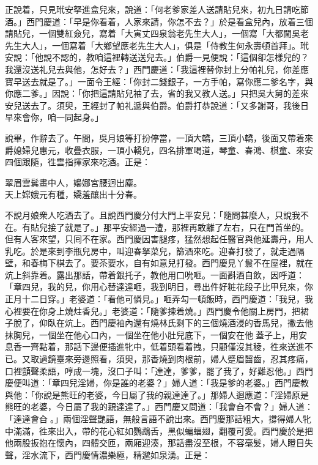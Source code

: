 正說着，只見玳安拏進盒兒來，說道：「何老爹家差人送請貼兒來，初九日請吃節酒。」西門慶道：「早是你看着，人家來請，你怎不去？」於是看盒兒內，放着三個請貼兒，一個雙紅僉兒，寫着「大寅丈四泉翁老先生大人」，一個寫「大都閫吳老先生大人」，一個寫着「大鄉望應老先生大人」，俱是「侍教生何永壽頓首拜」。玳安說：「他說不認的，教咱這裡轉送送兒去。」伯爵一見便說：「這個卻怎樣兒的？我還沒送礼兒去與他，怎好去？」西門慶道：「我這裡替你封上分帕礼兒，你差應寶早送去就是了。」一面令王經：「你封二錢銀子，一方手帕，寫你應二爹名字，與你應二爹。」因說：「你把這請貼兒袖了去，省的我又教人送。」只把吳大舅的差來安兒送去了。須臾，王經封了帕礼遞與伯爵。伯爵打恭說道：「又多謝哥，我後日早來會你，咱一同起身。」

說畢，作辭去了。午間，吳月娘等打扮停當，一頂大轎，三頂小轎，後面又帶着來爵媳婦兒惠元，收疊衣服，一頂小轎兒，四名排軍喝道，琴童、春鴻、棋童、來安四個跟隨，徃雲指揮家來吃酒。正是：

\begin{myquote}
翠眉雲鬂畫中人，嬝娜宮腰迥出塵。\\天上嫦娥元有種，嬌羞釀出十分春。
\end{myquote}

不說月娘衆人吃酒去了。且說西門慶分付大門上平安兒：「隨問甚麼人，只說我不在。有貼兒接了就是了。」那平安經過一遭，那裡再敢離了左右，只在門首坐的。但有人客來望，只囘不在家。西門慶因害腿疼，猛然想起任醫官與他延壽丹，用人乳吃。{}於是來到李瓶兒房中，叫迎春拏菜兒，篩酒來吃。迎春打發了，就走過隔壁，和春梅下棋去了。要茶要水，自有如意兒打發。西門慶見丫鬟不在屋裡，就在炕上斜靠着。露出那話，帶着銀托子，教他用口吮咂。一面斟酒自飲，因呼道：「章四兒，我的兒，你用心替達達咂，我到明日，尋出件好粧花段子比甲兒來，你正月十二日穿。」老婆道：「看他可憐見。」咂弄勾一頓飯時，西門慶道：「我兒，我心裡要在你身上燒炷香兒。」老婆道：「隨爹揀着燒。」西門慶令他關上房門，把裙子脫了，仰臥在炕上。西門慶袖內還有燒林氏剩下的三個燒酒浸的香馬兒，撇去他抹胸兒，一個坐在他心口內，一個坐在他小肚兒底下，一個安在他𣭈蓋子上，用安息香一齊點着，那話下邊便插進牝中，低着頭看着拽，只顧僅沒其稜，徃來送進不已。又取過鏡臺來旁邊照看，{}須臾，那香燒到肉根前，婦人蹙眉齧齒，忍其疼痛，口裡顫聲柔語，哼成一塊，沒口子叫：「達達，爹爹，罷了我了，好難忍他。」西門慶便叫道：「章四兒淫婦，你是誰的老婆？」婦人道：「我是爹的老婆。」西門慶教與他：「你說是熊旺的老婆，今日屬了我的親達達了。」{}那婦人迴應道：「淫婦原是熊旺的老婆，今日屬了我的親達達了。」西門慶又問道：「我會㒲不會？」婦人道：「達達會㒲𣭈。」兩個淫聲艷語，無般言語不說出來。西門慶那話粗大，撐得婦人牝中滿滿，徃來出入，帶的花心紅如鸚鵡舌，黑似蝙蝠翅，翻覆可愛。西門慶於是把他兩股扳抱在懷內，四體交匝，兩廂迎湊，那話盡沒至根，不容毫髮，婦人瞪目失聲，淫水流下，西門慶情濃樂極，精邈如泉湧。正是：

